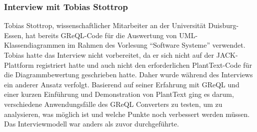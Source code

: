 \subsubsection{Interview mit Tobias Stottrop}

Tobias Stottrop, wissenschaftlicher Mitarbeiter an der Universität Duisburg-Essen, hat bereits GReQL-Code für die
Auswertung von UML-Klassendiagrammen im Rahmen des Vorlesung ``Software Systeme'' verwendet. Tobias hatte das Interview
nicht vorbereitet, da er sich nicht auf der JACK-Plattform registriert hatte und auch nicht den erforderlichen
PlantText-Code für die Diagrammbewertung geschrieben hatte. Daher wurde während des Interviews ein anderer Ansatz
verfolgt. Basierend auf seiner Erfahrung mit GReQL und einer kurzen Einführung und Demonstration von PlantText ging
es darum, verschiedene Anwendungsfälle des GReQL Converters zu testen, um zu analysieren, was möglich ist und welche
Punkte noch verbessert werden müssen. Das Interviewmodell war anders als zuvor durchgeführte.

